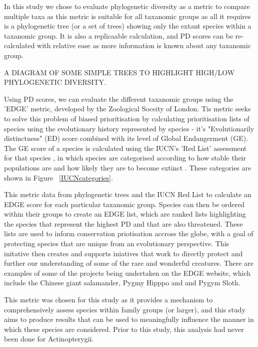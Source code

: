 \documentclass[11pt]{article}
\begin{document}
In this study we chose to evaluate phylogenetic diversity as a metric to 
compare multiple taxa as this metric is suitable for all taxanomic groups as 
all it requires is a phylogenetic tree (or a set of trees) showing only the 
extant species within a taxanomic group. It is also a replicaable calculation, 
and PD scores can be re-calculated with relative ease as more information is 
known about any taxanomic group. 

\INSERT A DIAGRAM OF SOME SIMPLE TREES TO HIGHLIGHT HIGH/LOW PHYLOGENETIC 
DIVERSITY. 

Using PD scores, we can evaluate the different taxanomic groups using the 
'EDGE' metric, developed by 
the Zoological Soceity of London. Tis metric seeks to solve this problem of 
biased prioritisation by 
calculating prioritisation lists of species using the evolutionary history 
represented by species - it's "Evolutionarily distinctness" (ED) score 
combined with 
its level of Global Endangerment (GE). The GE score of a species is calculated 
using the IUCN's 'Red 
List' assessment for that species \autocite{Isaac2007}, in which species are 
categorised according to how stable their populations are and how likely they 
are to become extinct \autocite{IUCN2000}. These categories are shown in Figure 
~\ref{IUCNcategories}.

 This metric data from phylogenetic trees and the IUCN Red List \cite{IUCN2000} 
 to calculate an EDGE score for each particular 
taxanomic group. Species can then be ordered within their groups to create an 
EDGE list, which are ranked lists highlighting the species that represent the 
highest PD and that are also threatened. These lists are used to inform 
conservation priotisation accross the globe, with a goal of protecting species 
that are unique from an evolutionary perspective. This initative then creates 
and supports iniatives that work to directly protect and further our 
understanding of some of the rare and wonderful creatures. There are examples 
of some of the 
projects being undertaken on the EDGE website, which include the Chinese giant 
salamander, Pygmy Hipppo and and Pygym Sloth\cite{}. 

 This metric was chosen for this 
study as it provides a mechanism to comprehensively assess species within 
family 
groups (or larger), and this study aims to produce results that can be 
used to meaningfully influence the manner in which these species are 
considered. 
Prior to this study, this analysis had never been done for Actinopterygii. 
\end{document}
